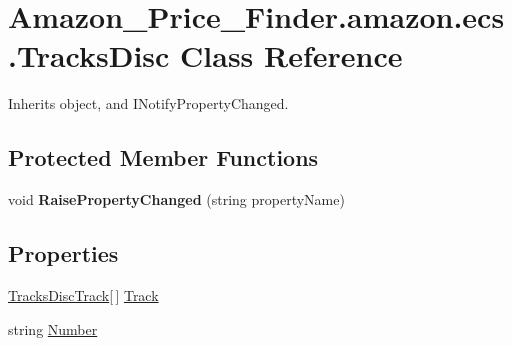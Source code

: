 \hypertarget{class_amazon___price___finder_1_1amazon_1_1ecs_1_1_tracks_disc}{\section{Amazon\-\_\-\-Price\-\_\-\-Finder.\-amazon.\-ecs.\-Tracks\-Disc Class Reference}
\label{class_amazon___price___finder_1_1amazon_1_1ecs_1_1_tracks_disc}
}


 




Inherits object, and I\-Notify\-Property\-Changed.

\subsection*{Protected Member Functions}
\begin{DoxyCompactItemize}
\item 
\hypertarget{class_amazon___price___finder_1_1amazon_1_1ecs_1_1_tracks_disc_af20e086e96f69d892fcf67f7c7df7b5c}{void {\bfseries Raise\-Property\-Changed} (string property\-Name)}\label{class_amazon___price___finder_1_1amazon_1_1ecs_1_1_tracks_disc_af20e086e96f69d892fcf67f7c7df7b5c}

\end{DoxyCompactItemize}
\subsection*{Properties}
\begin{DoxyCompactItemize}
\item 
\hypertarget{class_amazon___price___finder_1_1amazon_1_1ecs_1_1_tracks_disc_aca98d499ed0bbde7a17e1349e33157e4}{\hyperlink{class_amazon___price___finder_1_1amazon_1_1ecs_1_1_tracks_disc_track}{Tracks\-Disc\-Track}\mbox{[}$\,$\mbox{]} \hyperlink{class_amazon___price___finder_1_1amazon_1_1ecs_1_1_tracks_disc_aca98d499ed0bbde7a17e1349e33157e4}{Track}}\label{class_amazon___price___finder_1_1amazon_1_1ecs_1_1_tracks_disc_aca98d499ed0bbde7a17e1349e33157e4}

\begin{DoxyCompactList}\small\item\em \end{DoxyCompactList}\item 
\hypertarget{class_amazon___price___finder_1_1amazon_1_1ecs_1_1_tracks_disc_a74a3468d0717823740795ed828625d4b}{string \hyperlink{class_amazon___price___finder_1_1amazon_1_1ecs_1_1_tracks_disc_a74a3468d0717823740795ed828625d4b}{Number}}\label{class_amazon___price___finder_1_1amazon_1_1ecs_1_1_tracks_disc_a74a3468d0717823740795ed828625d4b}

\begin{DoxyCompactList}\small\item\em \end{DoxyCompactList}\end{DoxyCompactItemize}
